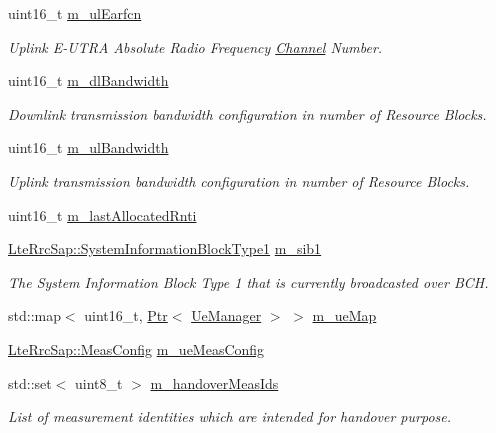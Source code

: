 \begin{DoxyCompactItemize}
uint16\+\_\+t \hyperlink{classns3_1_1LteEnbRrc_a34f34f9748426411f1027d0550dbe2c0}{m\+\_\+ul\+Earfcn}
\begin{DoxyCompactList}\small\item\em Uplink E-\/\+U\+T\+RA Absolute Radio Frequency \hyperlink{classns3_1_1Channel}{Channel} Number. \end{DoxyCompactList}\item 
uint16\+\_\+t \hyperlink{classns3_1_1LteEnbRrc_afb2dd8321c2d4733572c9240f7bc9751}{m\+\_\+dl\+Bandwidth}
\begin{DoxyCompactList}\small\item\em Downlink transmission bandwidth configuration in number of Resource Blocks. \end{DoxyCompactList}\item 
uint16\+\_\+t \hyperlink{classns3_1_1LteEnbRrc_a72fae86a1a284d181d9b977bf0201ed0}{m\+\_\+ul\+Bandwidth}
\begin{DoxyCompactList}\small\item\em Uplink transmission bandwidth configuration in number of Resource Blocks. \end{DoxyCompactList}\item 
uint16\+\_\+t \hyperlink{classns3_1_1LteEnbRrc_ab80ed01f0148876dbf268e4fa2984be6}{m\+\_\+last\+Allocated\+Rnti}
\item 
\hyperlink{structns3_1_1LteRrcSap_1_1SystemInformationBlockType1}{Lte\+Rrc\+Sap\+::\+System\+Information\+Block\+Type1} \hyperlink{classns3_1_1LteEnbRrc_afce975031adff5a9b596d62cfc1ab633}{m\+\_\+sib1}
\begin{DoxyCompactList}\small\item\em The System Information Block Type 1 that is currently broadcasted over B\+CH. \end{DoxyCompactList}\item 
std\+::map$<$ uint16\+\_\+t, \hyperlink{classns3_1_1Ptr}{Ptr}$<$ \hyperlink{classns3_1_1UeManager}{Ue\+Manager} $>$ $>$ \hyperlink{classns3_1_1LteEnbRrc_a7cf28bbc2890b86221ed1d901da8ad73}{m\+\_\+ue\+Map}
\item 
\hyperlink{structns3_1_1LteRrcSap_1_1MeasConfig}{Lte\+Rrc\+Sap\+::\+Meas\+Config} \hyperlink{classns3_1_1LteEnbRrc_a98d0766aa6a671bb20f2996c634e6b17}{m\+\_\+ue\+Meas\+Config}
\item 
std\+::set$<$ uint8\+\_\+t $>$ \hyperlink{classns3_1_1LteEnbRrc_a6b2843eb1523e27a5682d68709d6306e}{m\+\_\+handover\+Meas\+Ids}
\begin{DoxyCompactList}\small\item\em List of measurement identities which are intended for handover purpose. \end{DoxyCompactList}\item 

\end{DoxyCompactItemize}
